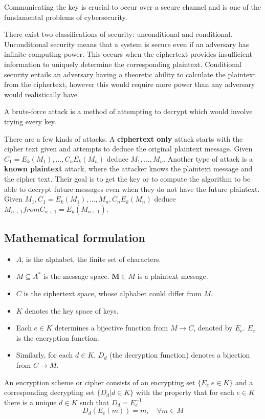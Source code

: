 \documentclass[11pt]{article}
\begin{document}
Communicating the key is crucial to occur over a secure channel and is one of the fundamental problems of cybersecurity.

There exist two classifications of security: unconditional and conditional.
Unconditional security means that a system is secure even if an adversary has infinite computing power.
This occurs when the ciphertext provides insufficient information to uniquely determine the corresponding plaintext.
Conditional security entails an adversary having a theoretic ability to calculate the plaintext from the ciphertext, however this would require more power than any adversary would realistically have.

A brute-force attack is a method of attempting to decrypt which would involve trying every key.

There are a few kinds of attacks.
A \textbf{ciphertext only} attack starts with the cipher text given and attempts to deduce the original plaintext message.
Given $C_1 = E_k (M_1), \dots, C_n E_k (M_n)$ deduce $M_1, \dots, M_n$.
Another type of attack is a \textbf{known plaintext} attack, where the attacker knows the plaintext message and the cipher text.
Their goal is to get the key or to compute the algorithm to be able to decrypt future messages even when they do not have the future plaintext.
Given $M_1, C_1 = E_k (M_1), \dots, M_n, C_n E_k (M_n)$ deduce $M_{n+1} from C_{n+1} = E_k (M_{n+1})$.

\subsection{Mathematical formulation}
\begin{itemize}
    \item $A$, is the alphabet, the finite set of characters.
    \item $M \subseteq A^*$ is the message space. $\textbf{M} \in M $ is a plaintext message.
    \item $C$ is the ciphertext space, whose alphabet could differ from $M$.
    \item $K$ denotes the key space of keys.
    \item Each $e \in K$ determines a bijective function from $M \to C$, denoted by $E_e$. $E_e$ is the encryption function.
    \item Similarly, for each $d \in K$, $D_d$ (the decryption function) denotes a bijection from $C \to M$.
\end{itemize}

An encryption scheme or cipher consists of an encrypting set $\{ E_e | e \in K \}$ and a corresponding decrypting set $ \{ D_d | d \in K \}$ with the property that for each $e \in K$ there is a unique $d \in K$ such that $D_d = E_e^{-1}$
\begin{equation}
    D_d(E_e(m)) = m, \quad \forall m \in M
\end{equation}
\end{document}
